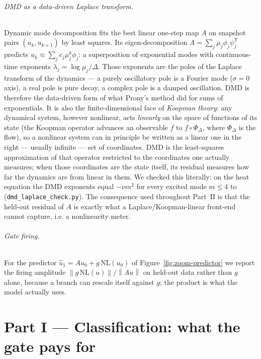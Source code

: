 \documentclass[11pt,a4paper]{article}
\newcommand{\norm}[1]{\left\lVert #1 \right\rVert}
\begin{document}
\paragraph{DMD as a data-driven Laplace transform.} Dynamic mode decomposition \cite{schmid,mezic} fits the best linear one-step map $A$ on snapshot pairs $(u_k, u_{k+1})$ by least squares. Its eigen-decomposition $A = \sum_j \mu_j \phi_j \psi_j^{\mathsf T}$ predicts $u_k \approx \sum_j c_j \mu_j^{k} \phi_j$: a superposition of exponential modes with continuous-time exponents $\lambda_j = \log\mu_j / \Delta$. Those exponents are the poles of the Laplace transform of the dynamics — a purely oscillatory pole is a Fourier mode ($\sigma = 0$ axis), a real pole is pure decay, a complex pole is a damped oscillation. DMD is therefore the data-driven form of what Prony's method did for sums of exponentials. It is also the finite-dimensional face of \emph{Koopman theory}: any dynamical system, however nonlinear, acts \emph{linearly} on the space of functions of its state (the Koopman operator advances an observable $f$ to $f\circ\Phi_\Delta$, where $\Phi_\Delta$ is the flow), so a nonlinear system can in principle be written as a linear one in the right — usually infinite — set of coordinates. DMD is the least-squares approximation of that operator restricted to the coordinates one actually measures; when those coordinates are the state itself, its residual measures how far the dynamics are from linear in them. We checked this literally: on the heat equation the DMD exponents equal $-\nu m^2$ for every excited mode $m \le 4$ to \dmdLaplaceErr{} (\texttt{dmd\_laplace\_check.py}). The consequence used throughout Part~II is that the held-out residual of $A$ is exactly what a Laplace/Koopman-linear front-end cannot capture, i.e. a nonlinearity meter.

\paragraph{Gate firing.} For the predictor $\hat u_1 = A u_0 + g\,\mathrm{NL}(u_0)$ of Figure~\ref{fig:zoom-predictor} we report the firing amplitude $\norm{g\,\mathrm{NL}(u)} / \norm{Au}$ on held-out data rather than $g$ alone, because a branch can rescale itself against $g$; the product is what the model actually uses.

\part*{Part I — Classification: what the gate pays for}
\end{document}
